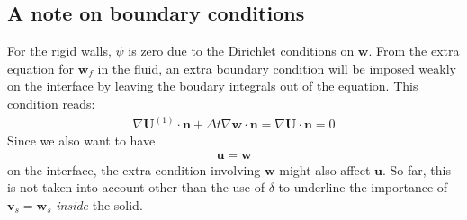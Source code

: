 \documentclass{article}
\begin{document}
\subsection{A note on boundary conditions}
For the rigid walls, $\psi$ is zero due to the Dirichlet conditions on $\mathbf{w}$. From the extra equation for $\mathbf{w}_f$ in the fluid, an extra boundary condition will be imposed weakly on the interface by leaving the boudary integrals out of the equation. This condition reads:
\begin{align}
\nabla \mathbf{U}^{(1)} \cdot \mathbf{n} + \Delta t \nabla \mathbf{w} \cdot \mathbf{n} = \nabla \mathbf{U} \cdot \mathbf{n} = 0 
\end{align}
Since we also want to have
\begin{align}
\mathbf{u} = \mathbf{w}
\end{align}
on the interface, the extra condition involving $\mathbf{w}$ might also affect $\mathbf{u}$. So far, this is not taken into account other than the use of $\delta$ to underline the importance of $\mathbf{v}_s = \mathbf{w}_s$ \textit{inside} the solid. 
\end{document}
